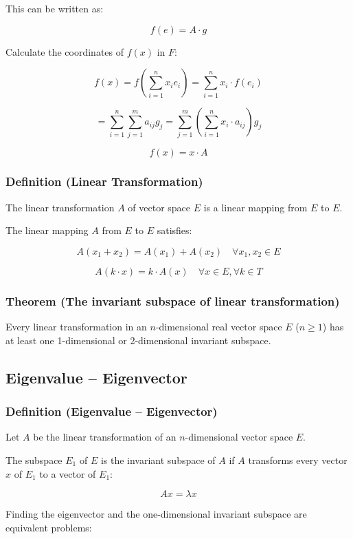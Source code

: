 This can be written as:

\[
f(e) = A \cdot g
\]

Calculate the coordinates of $f(x)$ in $F$:

\[
f(x) = f\left(\sum_{i=1}^n x_i e_i\right) = \sum_{i=1}^n x_i \cdot f(e_i)
\]

\[
= \sum_{i=1}^n \sum_{j=1}^m a_{ij} g_j = \sum_{j=1}^m \left(\sum_{i=1}^n x_i \cdot a_{ij}\right) g_j
\]

\[
f(x) = x \cdot A
\]

\subsubsection{Definition (Linear Transformation)}

The linear transformation $A$ of vector space $E$ is a linear mapping from $E$ to $E$.

The linear mapping $A$ from $E$ to $E$ satisfies:

\[
A(x_1 + x_2) = A(x_1) + A(x_2) \quad \forall x_1, x_2 \in E
\]

\[
A(k \cdot x) = k \cdot A(x) \quad \forall x \in E, \forall k \in T
\]

\subsubsection{Theorem (The invariant subspace of linear transformation)}

Every linear transformation in an $n$-dimensional real vector space $E$ ($n \geq 1$) has at least one 1-dimensional or 2-dimensional invariant subspace.


\subsection{Eigenvalue – Eigenvector}

\subsubsection{Definition (Eigenvalue – Eigenvector)}

Let $A$ be the linear transformation of an $n$-dimensional vector space $E$.

The subspace $E_1$ of $E$ is the invariant subspace of $A$ if $A$ transforms every vector $x$ of $E_1$ to a vector of $E_1$:

\[
A x = \lambda x
\]

Finding the eigenvector and the one-dimensional invariant subspace are equivalent problems:


